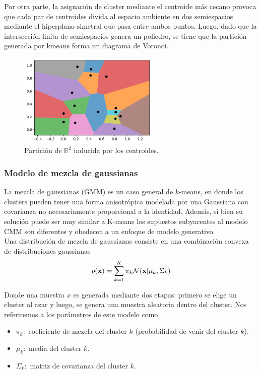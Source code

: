 Por otra parte, la asignación de cluster mediante el centroide más cecano provoca que cada par de centroides divida al espacio ambiente en dos semiespacios mediante el hiperplano simetral que pasa entre ambos puntos. Luego, dado que la intersección finita de semiespacios genera un poliedro, se tiene que la partición generada por kmeans forma un diagrama de Voronoi.

\begin{figure}[h]
  \centering
  \includegraphics[width=0.6\textwidth]{img/cap8_voronoi}
  \caption{Partición de $\mathbb{R}^2$ inducida por los centroides.}
  \label{fig:kmeans}
\end{figure}


\subsubsection{Modelo de mezcla de gaussianas}

La mezcla de gaussianas (GMM) es un caso general de $k$-means, en donde los clusters pueden tener una forma anisotrópica modelada por una Gaussiana con covarianza no necesariamente proporcional a la identidad. Además, si bien su solución puede ser muy similar a K-means los supuestos subyacentes al modelo CMM son diferentes y obedecen a un enfoque de modelo generativo. \\


Una distribución de mezcla de gaussianas consiste en una combinación convexa de distribuciones gaussianas
\begin{equation}
	p(\mathbf{x}) = \sum_{k=1}^K \pi_k \mathcal{N}(\mathbf{x}| \mu_k,\Sigma_k)
\end{equation}

Donde una muestra $x$ es generada mediante dos etapas: primero se elige un cluster al azar y luego, se genera una muestra aleatoria dentro del cluster. Nos referiremos a los parámetros de este modelo como 

\begin{itemize}
	\item $\pi_k:$ coeficiente de mezcla del cluster  $k$ (probabilidad de venir del cluster $k$).
	\item $\mu_k:$ media del cluster  $k$.
	\item $\Sigma_k:$ matriz de covarianza del cluster  $k$.
\end{itemize}

